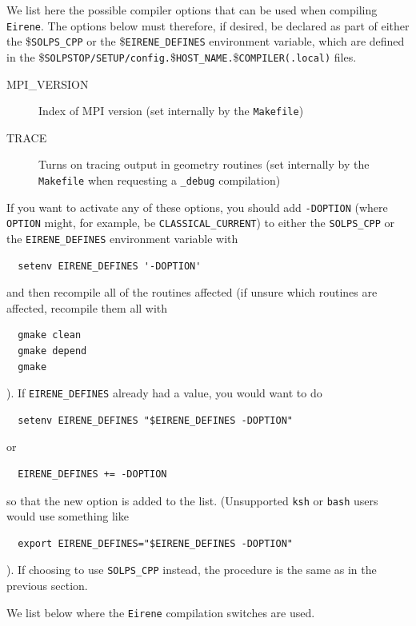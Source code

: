 \documentclass[a4paper,10pt]{report}
\begin{document}

We list here the possible compiler options that can be used when compiling {\tt Eirene}.
The options below must therefore,
if desired, be declared as part of either the \${\tt SOLPS\_CPP} or the
\${\tt EIRENE\_DEFINES} environment variable, which are defined in the
\${\tt SOLPSTOP/SETUP/config.}\${\tt {HOST\_NAME}.}\${\tt {COMPILER}(.local)} files.

\begin{description}
\item[MPI\_VERSION]  Index of MPI version (set internally by the {\tt Makefile})
\item[TRACE]  Turns on tracing output in geometry routines (set internally by the {\tt Makefile} when requesting a {\tt \_debug} compilation)
\end{description}

If you want to activate any of these options, you should add
{\tt -DOPTION} (where {\tt OPTION} might, for example, be
{\tt CLASSICAL\_CURRENT}) to either the {\tt SOLPS\_CPP}
or the {\tt EIRENE\_DEFINES} environment variable with
\begin{verbatim}
  setenv EIRENE_DEFINES '-DOPTION'
\end{verbatim}
and then recompile all of the routines affected (if unsure which
routines are affected, recompile them all with
\begin{verbatim}
  gmake clean
  gmake depend
  gmake
\end{verbatim}
).  If {\tt EIRENE\_DEFINES} already had a value, you would want to do
\begin{verbatim}
  setenv EIRENE_DEFINES "$EIRENE_DEFINES -DOPTION"
\end{verbatim}
or
\begin{verbatim}
  EIRENE_DEFINES += -DOPTION
\end{verbatim}
so that the new option is added to the list. (Unsupported {\tt ksh}
or {\tt bash} users would use something like
\begin{verbatim}
  export EIRENE_DEFINES="$EIRENE_DEFINES -DOPTION"
\end{verbatim}
). If choosing to use {\tt SOLPS\_CPP} instead, the procedure is the same as
in the previous section.

We list below where the {\tt Eirene} compilation switches are used.
\end{document}
